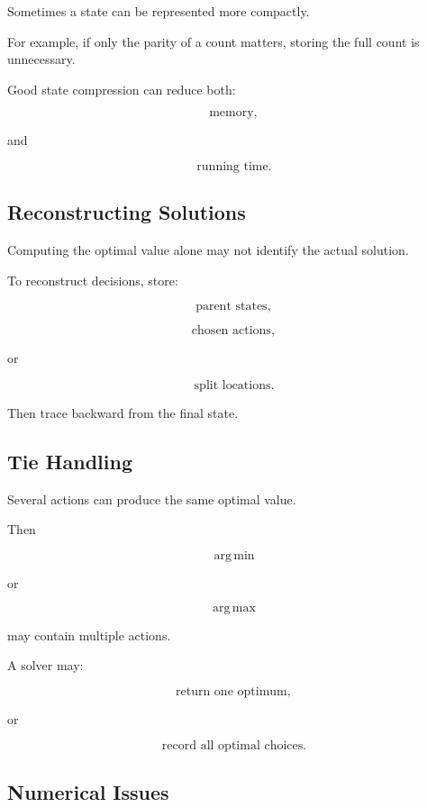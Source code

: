 Sometimes a state can be represented more compactly.

For example, if only the parity of a count matters, storing the full count
is unnecessary.

Good state compression can reduce both:

\[
\boxed{
\text{memory},
}
\]

and

\[
\boxed{
\text{running time}.
}
\]

\subsection{Reconstructing Solutions}
\label{subsec:reconstructing-dp-solutions}

Computing the optimal value alone may not identify the actual solution.

To reconstruct decisions, store:

\[
\boxed{
\text{parent states},
}
\]

\[
\boxed{
\text{chosen actions},
}
\]

or

\[
\boxed{
\text{split locations}.
}
\]

Then trace backward from the final state.

\subsection{Tie Handling}
\label{subsec:dynamic-programming-ties}

Several actions can produce the same optimal value.

Then

\[
\operatorname*{arg\,min}
\]

or

\[
\operatorname*{arg\,max}
\]

may contain multiple actions.

A solver may:

\[
\boxed{
\text{return one optimum},
}
\]

or

\[
\boxed{
\text{record all optimal choices}.
}
\]

\subsection{Numerical Issues}
\label{subsec:dynamic-programming-numerical-issues}

